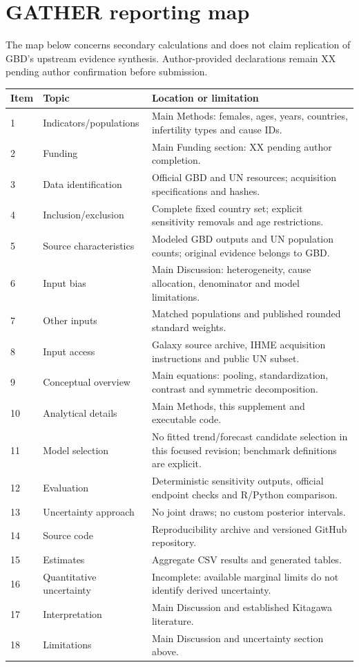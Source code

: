 \documentclass[11pt,a4paper]{article}
\begin{document}
\section{GATHER reporting map}
The map below concerns secondary calculations and does not claim replication of GBD's upstream evidence synthesis. Author-provided declarations remain XX pending author confirmation before submission.
\small
\begin{longtable}{p{}p{}p{}}
\toprule Item & Topic & Location or limitation\\\midrule\endhead
1 & Indicators/populations & Main Methods: females, ages, years, countries, infertility types and cause IDs.\\
2 & Funding & Main Funding section: XX pending author completion.\\
3 & Data identification & Official GBD and UN resources; acquisition specifications and hashes.\\
4 & Inclusion/exclusion & Complete fixed country set; explicit sensitivity removals and age restrictions.\\
5 & Source characteristics & Modeled GBD outputs and UN population counts; original evidence belongs to GBD.\\
6 & Input bias & Main Discussion: heterogeneity, cause allocation, denominator and model limitations.\\
7 & Other inputs & Matched populations and published rounded standard weights.\\
8 & Input access & Galaxy source archive, IHME acquisition instructions and public UN subset.\\
9 & Conceptual overview & Main equations: pooling, standardization, contrast and symmetric decomposition.\\
10 & Analytical details & Main Methods, this supplement and executable code.\\
11 & Model selection & No fitted trend/forecast candidate selection in this focused revision; benchmark definitions are explicit.\\
12 & Evaluation & Deterministic sensitivity outputs, official endpoint checks and R/Python comparison.\\
13 & Uncertainty approach & No joint draws; no custom posterior intervals.\\
14 & Source code & Reproducibility archive and versioned GitHub repository.\\
15 & Estimates & Aggregate CSV results and generated tables.\\
16 & Quantitative uncertainty & Incomplete: available marginal limits do not identify derived uncertainty.\\
17 & Interpretation & Main Discussion and established Kitagawa literature.\\
18 & Limitations & Main Discussion and uncertainty section above.\\\bottomrule
\end{longtable}\normalsize
\end{document}
